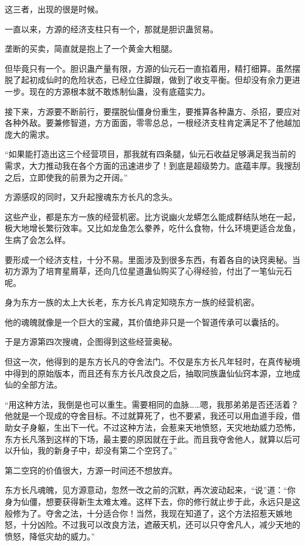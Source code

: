 \begin{this_body}
这三者，出现的很是时候。

一直以来，方源的经济支柱只有一个，那就是胆识蛊贸易。

垄断的买卖，简直就是抱上了一个黄金大粗腿。

但毕竟只有一个。胆识蛊产量有限，方源的仙元石一直掐着用，精打细算。虽然摆脱了起初成仙时的危险状态，已经立住脚跟，做到了收支平衡。但却没有余力更进一步。现在的方源根本就不敢炼制仙蛊，没有底蕴实力。

接下来，方源要不断前行，要摆脱仙僵身份重生，要推算各种蛊方、杀招，要应对各种外敌。要兼修智道，方方面面，零零总总，一根经济支柱肯定满足不了他越加庞大的需求。

“如果能打造出这三个经营项目，那我就有四条腿，仙元石收益足够满足我当前的需求，大力推动我在各个方面的迅速进步了！到底是超级势力。底蕴丰厚。我搜刮之后，立即使我的前景为之开阔。”

方源感叹的同时，又升起搜魂东方长凡的念头。

这些产业，都是东方一族的经营机密。比方说幽火龙蟒怎么能成群结队地在一起，极大地增长繁衍效率。又比如龙鱼怎么豢养，吃什么食物，什么环境更适合龙鱼，生病了会怎么样。

要形成一个经济支柱，十分不易。里面涉及到很多东西，有着各自的诀窍奥秘。当初方源为了培育星屑草，还向几位星道蛊仙购买了心得经验，付出了一笔仙元石呢。

身为东方一族的太上大长老，东方长凡肯定知晓东方一族的经营机密。

他的魂魄就像是一个巨大的宝藏，其价值绝非只是一个智道传承可以囊括的。

于是方源第四次搜魂，企图得到这些经营奥秘。

但这一次，他得到的是东方长凡的夺舍法门。不仅是东方长凡年轻时，在真传秘境中得到的原始版本，而且还有东方长凡改良之后，抽取同族蛊仙仙窍本源，立地成仙的全部方法。

“用这种方法，我倒是也可以重生。需要相同的血脉……嗯，我那弟弟是否还活着？他就是一个现成的夺舍目标。不过就算死了，也不要紧，我还可以用血道手段，借助女子身躯，生出下一代。不过这种方法，会惹来天地愤怒，天灾地劫威力恐怖，东方长凡落到这样的下场，最主要的原因就在于此。而且我夺舍他人，就算以后可以升仙，我的新身子中，却没有第二个空窍了。”

第二空窍的价值很大，方源一时间还不想放弃。

东方长凡魂魄，见方源意动，忽然一改之前的沉默，再次波动起来，“说”道：“你身为仙僵，想要获得新生太难太难。这样下去，你的修行就止步于此，永远只是这般修为了。夺舍之法，十分适合你！当然，我现在知道了，这个方法招惹天嫉地怒，十分凶险。不过我可以改良方法，遮蔽天机，还可以只夺舍凡人，减少天地的愤怒，降低灾劫的威力。”


\end{this_body}
